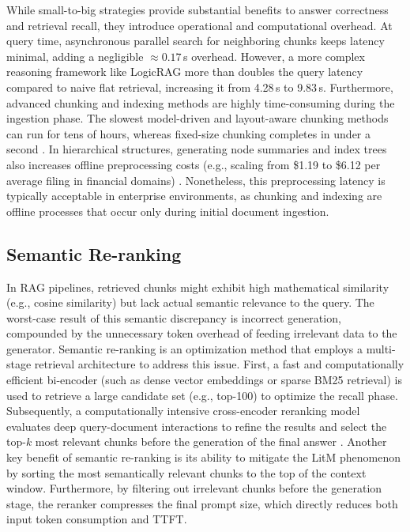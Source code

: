 While small-to-big strategies provide substantial benefits to answer correctness and retrieval recall, they introduce operational and computational overhead. At query time, asynchronous parallel search for neighboring chunks \citep{lumer2026rethinking} keeps latency minimal, adding a negligible $\approx 0.17$\,s overhead. However, a more complex reasoning framework like LogicRAG \citep{chen2026logicrag} more than doubles the query latency
compared to naive flat retrieval, increasing it from 4.28\,s to 9.83\,s. Furthermore, advanced chunking and indexing methods are highly time-consuming during the ingestion phase. The slowest model-driven and layout-aware chunking methods can run for tens of hours, whereas fixed-size chunking completes in under a second \citep{smigielski2026chunking}. In hierarchical structures, generating node summaries and index trees also increases offline preprocessing costs (e.g., scaling from \$1.19 to \$6.12 per average filing in financial domains) \citep{lumer2026rethinking}. Nonetheless, this preprocessing latency is typically acceptable in enterprise environments, as chunking and indexing are offline processes that occur only during initial document ingestion.

\subsection{Semantic Re-ranking}
\label{lit:re_rank}
In RAG pipelines, retrieved chunks might exhibit high mathematical similarity (e.g., cosine similarity) but lack actual semantic relevance to the query. The worst-case result of this semantic discrepancy is incorrect generation, compounded by the unnecessary token overhead of feeding irrelevant data to the generator. Semantic re-ranking is an optimization method that employs a multi-stage retrieval architecture to address this issue. First, a fast and computationally efficient bi-encoder (such as dense vector embeddings or sparse BM25 retrieval) is used to retrieve a large candidate set (e.g., top-100) to optimize the recall phase. Subsequently, a computationally intensive cross-encoder reranking model evaluates deep query-document interactions to refine the results and select the top-$k$ most relevant chunks before the generation of the final answer \citep{moreira2024enhancing, cheng2026enhancing}. Another key benefit of semantic re-ranking is its ability to mitigate the LitM phenomenon \citep{liu2024lost} by sorting the most semantically relevant chunks to the top of the context window. Furthermore, by filtering out irrelevant chunks before the generation stage, the reranker compresses the final prompt size, which directly reduces both input token consumption and TTFT.

